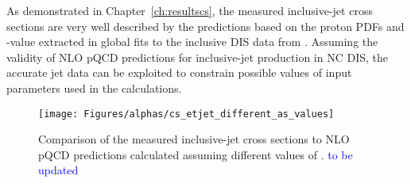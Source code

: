 As demonstrated in Chapter~\ref{ch:resultscs}, the measured inclusive-jet cross sections are very well described by the predictions based on the proton PDFs and \asz-value extracted in global fits to the inclusive DIS data from \hera. Assuming the validity of NLO pQCD predictions for inclusive-jet production in NC DIS, the accurate jet data can be exploited to constrain possible values of input parameters used in the calculations.
\begin{figure}[ht]
 \centering
 \texttt{[image: Figures/alphas/cs\_etjet\_different\_as\_values]}
 \caption{Comparison of the measured inclusive-jet cross sections to NLO pQCD predictions calculated assuming different values of \asz. \textcolor{blue}{to be updated}}
 \label{fig:etjetdifferentas}
\end{figure}

